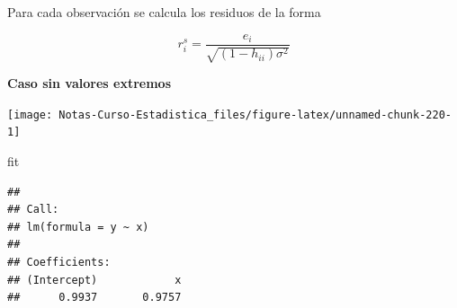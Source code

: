 \documentclass[
  12pt,
]{book}
\newenvironment{Shaded}{\begin{snugshade}}{\end{snugshade}}
\newcommand{\DataTypeTok}[1]{\textcolor[rgb]{0.13,0.29,0.53}{#1}}
\newcommand{\DecValTok}[1]{\textcolor[rgb]{0.00,0.00,0.81}{#1}}
\newcommand{\FloatTok}[1]{\textcolor[rgb]{0.00,0.00,0.81}{#1}}
\newcommand{\KeywordTok}[1]{\textcolor[rgb]{0.13,0.29,0.53}{\textbf{#1}}}
\newcommand{\NormalTok}[1]{#1}
\newcommand{\OperatorTok}[1]{\textcolor[rgb]{0.81,0.36,0.00}{\textbf{#1}}}
\newcommand{\StringTok}[1]{\textcolor[rgb]{0.31,0.60,0.02}{#1}}
\theoremstyle{definition}
\theoremstyle{definition}
\theoremstyle{definition}
\theoremstyle{remark}
\begin{document}
Para cada observación se calcula los residuos de la forma

\begin{equation*}
r_{i}^{s} = \frac{e_i}{\sqrt{(1-h_{ii}) \sigma^{2}}}
\end{equation*}

\textbf{Caso sin valores extremos}

\begin{Shaded}
\end{Shaded}

\begin{center}\texttt{[image: Notas-Curso-Estadistica\_files/figure-latex/unnamed-chunk-220-1]} \end{center}

\begin{Shaded}
\begin{Highlighting}[]
\NormalTok{fit}
\end{Highlighting}
\end{Shaded}

\begin{verbatim}
## 
## Call:
## lm(formula = y ~ x)
## 
## Coefficients:
## (Intercept)            x  
##      0.9937       0.9757
\end{verbatim}
\end{document}
